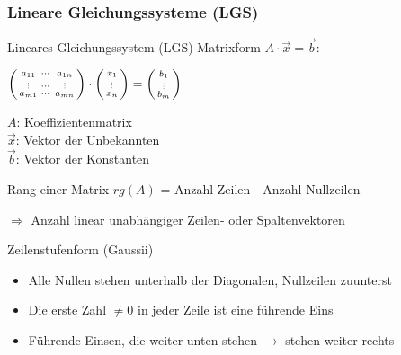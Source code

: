 \raggedcolumns
\columnbreak

\subsubsection*{Lineare Gleichungssysteme (LGS)}
    
        \begin{definition}{Lineares Gleichungssystem (LGS)}
            Matrixform $A\cdot\vec{x}=\vec{b}$:

            \begin{minipage}{0.55\linewidth}
                $\begin{psmallmatrix} a_{11} & \cdots & a_{1n} \\ \scalebox{0.5}{\vdots} & \cdots & \scalebox{0.5}{\vdots} \\ a_{m1} & \cdots & a_{mn} \end{psmallmatrix} \cdot \begin{psmallmatrix}
                    x_1 \\ \scalebox{0.5}{\vdots} \\ x_n
                \end{psmallmatrix} = \begin{psmallmatrix}
                    b_1 \\ \scalebox{0.5}{\vdots} \\ b_m
                \end{psmallmatrix}$
            \end{minipage}
            \begin{minipage}
                {0.45\linewidth}
                {\small
                $A$: Koeffizientenmatrix\\
                $\vec{x}$: Vektor der Unbekannten\\
                $\vec{b}$: Vektor der Konstanten}
            \end{minipage}
        \end{definition}

    
        \begin{theorem}{Rang einer Matrix} $rg(A)$ = Anzahl Zeilen - Anzahl Nullzeilen
            
            $\Rightarrow$ Anzahl linear unabhängiger Zeilen- oder Spaltenvektoren
        \end{theorem}


\begin{concept}{Zeilenstufenform (Gaussii)}
    \begin{itemize}
        \item Alle Nullen stehen unterhalb der Diagonalen, Nullzeilen zuunterst
        \item Die erste Zahl $\neq 0$ in jeder Zeile ist eine führende Eins
        \item Führende Einsen, die weiter unten stehen $\rightarrow$ stehen weiter rechts
    \end{itemize}
\end{concept}

